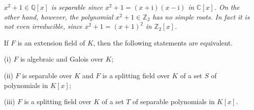 \begin{example}\em
$x^2+1\in\mathbb{Q}[x]$ is separable since $x^2+1=(x+\mathrm{i})(x-\mathrm{i})$ in $\mathbb{C}[x]$. On the other hand, however, the polynomial $x^2+1\in\mathbb{Z}_2$ has no simple roots. In fact it is not even irreducible, since $x^2+1=(x+1)^2$ in $\mathbb{Z}_2[x]$.
\end{example}
\begin{theorem}
If $F$ is an extension field of $K$, then the following statements are equivalent.\par
(i) $F$ is algebraic and Galois over $K$;\par
(ii) $F$ is separable over $K$ and $F$ is a splitting field over $K$ of a set $S$ of polynomials in $K[x]$;\par
(iii) $F$ is a splitting field over $K$ of a set $T$ of separable polynomials in $K[x]$.
\end{theorem}
